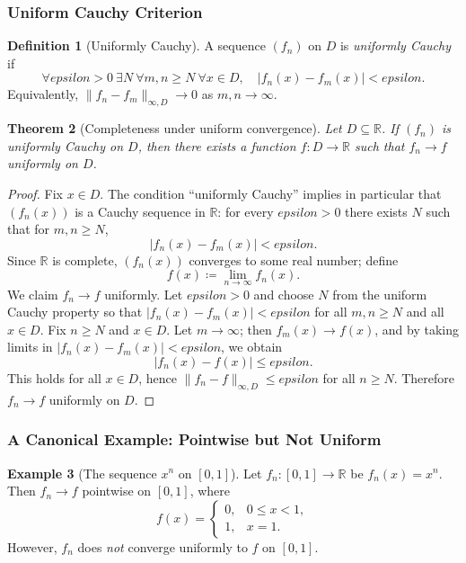 \documentclass[12pt]{article}
\numberwithin{equation}{section}
\def\abs#1{|#1|}
\def\eps{epsilon}
\newcommand{\RR}{\mathbb{R}}
\DeclarePairedDelimiter{\abs}{\lvert}{\rvert}
\newcommand{\eps}{\varepsilon}               %
\newcommand{\casesm}[1]{\begin{cases}#1\end{cases}}
\theoremstyle{plain}
\newtheorem{theorem}{Theorem}[section]
\theoremstyle{definition}
\newtheorem{definition}[theorem]{Definition}
\newtheorem{example}[theorem]{Example}
\theoremstyle{remark}
\begin{document}
\subsubsection{Uniform Cauchy Criterion}

\begin{definition}[Uniformly Cauchy]\label{def:uniform-cauchy}
A sequence $(f_n)$ on $D$ is \emph{uniformly Cauchy} if
\[
\forall \eps>0\ \exists N\ \forall m,n\ge N\ \forall x\in D,\quad
\abs{f_n(x)-f_m(x)}<\eps.
\]
Equivalently, $\|f_n-f_m\|_{\infty,D}\to 0$ as $m,n\to\infty$.
\end{definition}

\begin{theorem}[Completeness under uniform convergence]\label{thm:uniform-complete}
Let $D\subseteq\RR$. If $(f_n)$ is uniformly Cauchy on $D$, then there exists a function $f:D\to\RR$ such that
$f_n\to f$ uniformly on $D$.
\end{theorem}

\begin{proof}
Fix $x\in D$. The condition ``uniformly Cauchy'' implies in particular that $(f_n(x))$ is a Cauchy sequence in $\RR$:
for every $\eps>0$ there exists $N$ such that for $m,n\ge N$,
\[
\abs{f_n(x)-f_m(x)}<\eps.
\]
Since $\RR$ is complete, $(f_n(x))$ converges to some real number; define
\[
f(x)\coloneqq \lim_{n\to\infty} f_n(x).
\]
We claim $f_n\to f$ uniformly. Let $\eps>0$ and choose $N$ from the uniform Cauchy property so that
$\abs{f_n(x)-f_m(x)}<\eps$ for all $m,n\ge N$ and all $x\in D$.
Fix $n\ge N$ and $x\in D$. Let $m\to\infty$; then $f_m(x)\to f(x)$, and by taking limits in
$\abs{f_n(x)-f_m(x)}<\eps$, we obtain
\[
\abs{f_n(x)-f(x)}\le \eps.
\]
This holds for all $x\in D$, hence $\|f_n-f\|_{\infty,D}\le \eps$ for all $n\ge N$.
Therefore $f_n\to f$ uniformly on $D$.
\end{proof}

\subsubsection{A Canonical Example: Pointwise but Not Uniform}

\begin{example}[The sequence $x^n$ on {$[0,1]$}]\label{ex:xn}
Let $f_n:[0,1]\to\RR$ be $f_n(x)=x^n$.
Then $f_n\to f$ pointwise on $[0,1]$, where
\[
f(x)=
\casesm{
0, & 0\le x<1,\\
1, & x=1.
}
\]
However, $f_n$ does \emph{not} converge uniformly to $f$ on $[0,1]$.
\end{example}
\end{document}
